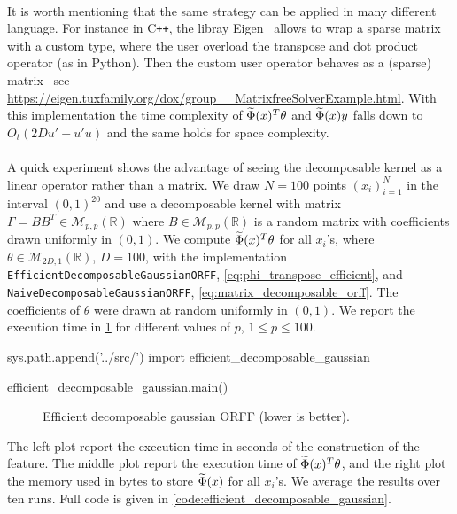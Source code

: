 \paragraph{}
It is worth mentioning that the same strategy can be applied in many different language. For instance in C{}\verb!++!, the libray Eigen~\citep{eigenweb} allows to wrap a sparse matrix with a custom type, where the user overload the transpose and dot product operator (as in Python). Then the custom user operator behaves as a (sparse) matrix --see \url{https://eigen.tuxfamily.org/dox/group__MatrixfreeSolverExample.html}. With this implementation the time complexity of $\widetilde{\Phi}(x)^T\theta$ and $\widetilde{\Phi}(x)y$ falls down to $O_t(2Du'+u'u)$ and the same holds for space complexity.
\paragraph{}
A quick experiment shows the advantage of seeing the decomposable kernel as a linear operator rather than a matrix. We draw $N=100$ points $(x_i)_{i=1}^N$ in the interval $(0,1)^{20}$ and use a decomposable kernel with matrix $\Gamma=BB^T\in\mathcal{M}_{p,p}(\mathbb{R})$ where $B\in\mathcal{M}_{p,p}(\mathbb{R})$ is a random matrix with coefficients drawn uniformly in $(0,1)$. We compute $\widetilde{\Phi}(x)^T\theta$ for all $x_i$'s, where $\theta\in\mathcal{M}_{2D,1}(\mathbb{R})$, $D=100$, with the implementation \texttt{Ef\-fi\-cient\-De\-com\-po\-sa\-ble\-Gaus\-sian\-ORFF}, \cref{eq:phi_transpose_efficient}, and \texttt{Na\-ive\-De\-com\-po\-sa\-ble\-Gaus\-sian\-ORFF}, \cref{eq:matrix_decomposable_orff}. The coefficients of $\theta$ were drawn at random uniformly in $(0,1)$. We report the execution time in \cref{fig:efficient_decomposable_gaussian} for different values of $p$, $1\le p\le100$.
\begin{pycode}
sys.path.append('../src/')
import efficient_decomposable_gaussian

efficient_decomposable_gaussian.main()
\end{pycode}
\begin{figure}[htb]
\caption[Efficient decomposable gaussian \acs{ORFF}]{Efficient decomposable gaussian ORFF (lower is better).}
\label{fig:efficient_decomposable_gaussian}
\end{figure}
The left plot report the execution time in seconds of the construction of the feature. The middle plot report the execution time of $\widetilde{\Phi}(x)^T\theta$, and the right plot the memory used in bytes  to store $\widetilde{\Phi}(x)$ for all $x_i$'s. We average the results over ten runs. Full code is given in \cref{code:efficient_decomposable_gaussian}.


